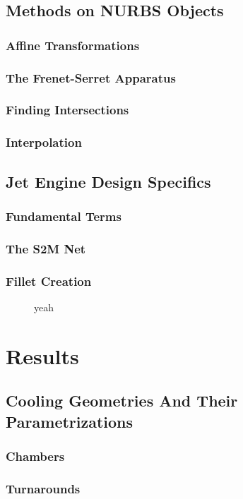 \documentclass[a4paper, 11pt]{report}
\theoremstyle{definition}
\begin{document}
\section{Methods on NURBS Objects}
\subsection{Affine Transformations}
\subsection{The Frenet-Serret Apparatus}
\subsection{Finding Intersections}
\subsection{Interpolation}

\section{Jet Engine Design Specifics}
\subsection{Fundamental Terms}
\subsection{The S2M Net}
\subsection{Fillet Creation}
\begin{figure}[H]
	\centering
	
	\caption{yeah}
\end{figure}

\chapter{Results}
\section{Cooling Geometries And Their Parametrizations}
\subsection{Chambers}
\subsection{Turnarounds}
\end{document}
